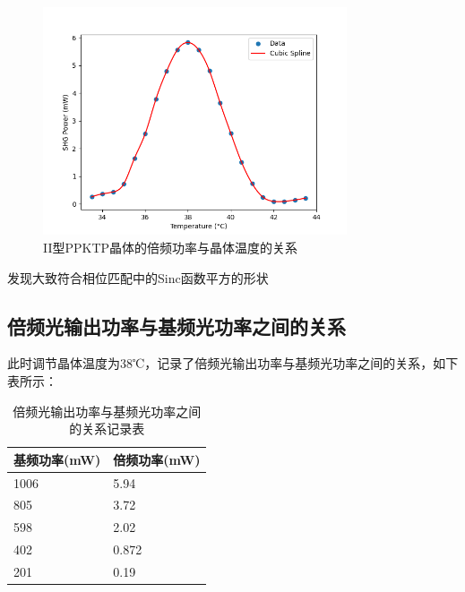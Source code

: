 \documentclass[a4paper,UTF8]{ctexart}
\begin{document}
\begin{figure}[H]
    \centering
    \begin{minipage}[b]{0.9\textwidth}
        \centering
        \includegraphics[width=0.8\textwidth]{./ffig1.png}
        \caption{II型PPKTP晶体的倍频功率与晶体温度的关系}
    \end{minipage}
\end{figure}

发现大致符合相位匹配中的Sinc函数平方的形状

\subsection{倍频光输出功率与基频光功率之间的关系}

此时调节晶体温度为38℃，记录了倍频光输出功率与基频光功率之间的关系，如下表所示：

\begin{table}[H]
    \centering
    \caption{倍频光输出功率与基频光功率之间的关系记录表}
    \begin{tabular}{|l|l|}
    \hline
        基频功率(mW) & 倍频功率(mW) \\ \hline
        1006 & 5.94 \\ \hline
        805 & 3.72 \\ \hline
        598 & 2.02 \\ \hline
        402 & 0.872 \\ \hline
        201 & 0.19 \\ \hline
    \end{tabular}
\end{table}
\end{document}
